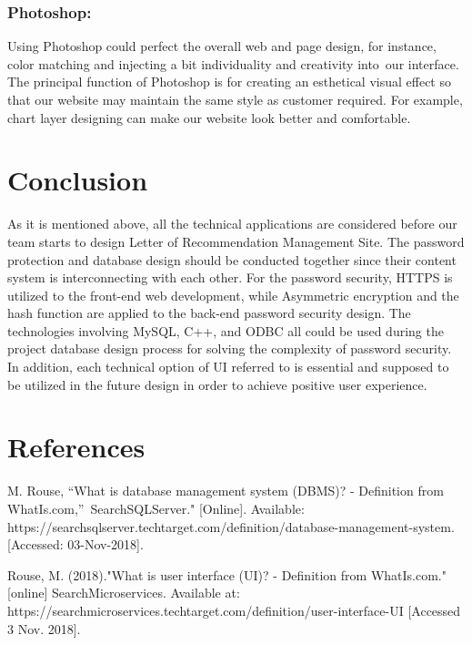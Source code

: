 \documentclass[onecolumn, draftclsnofoot,10pt, compsoc]{IEEEtran}
\begin{document}
\subsubsection{Photoshop:}
Using Photoshop could perfect the overall web and page design, for instance, color matching and injecting a bit individuality and creativity into our interface. The principal function of Photoshop is for creating an esthetical visual effect so that our website may maintain the same style as customer required. For example, chart layer designing can make our website look better and comfortable.


\section{Conclusion}
As it is mentioned above, all the technical applications are considered before our team starts to design Letter of Recommendation Management Site. The password protection and database design should be conducted together since their content system is interconnecting with each other. For the password security, HTTPS is utilized to the front-end web development, while Asymmetric encryption and the hash function are applied to the back-end password security design. The technologies involving MySQL, C++, and ODBC all could be used during the project database design process for solving the complexity of password security. In addition, each technical option of UI referred to is essential and supposed to be utilized in the future design in order to achieve positive user experience. 


\newpage
\section*{References}
\begin{flushleft}
[1] M. Rouse, “What is database management system (DBMS)? - Definition from WhatIs.com,” SearchSQLServer." [Online]. Available: https://searchsqlserver.techtarget.com/definition/database-management-system. [Accessed: 03-Nov-2018].
\end{flushleft}
\begin{flushleft}
[2] Rouse, M. (2018)."What is user interface (UI)? - Definition from WhatIs.com."[online] SearchMicroservices. Available at: https://searchmicroservices.techtarget.com/definition/user-interface-UI [Accessed 3 Nov. 2018]. 
\end{flushleft}
\end{document}
